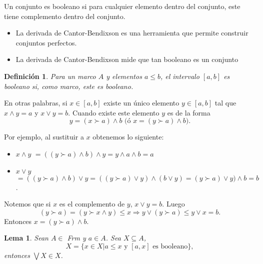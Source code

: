 \documentclass[12pt,letterpaper,titlepage]{article}
\newtheorem*{defn}{Definición}
\newtheorem{lemma}{Lema}
\theoremstyle{definition}
\newcommand\<{\langle}
\renewcommand\>{\rangle}
\begin{document}
Un conjunto es booleano si para cualquier elemento dentro del conjunto, este tiene complemento dentro del conjunto.
\begin{itemize}
\item La derivada de Cantor-Bendixson es una herramienta que permite construir conjuntos perfectos.
\item La derivada de Cantor-Bendixson mide que tan booleano es un conjunto
\end{itemize}

\begin{defn}
Para un marco $A$ y elementos $a\leq b$, el intervalo $[a,b]$ es booleano si, como marco, este es booleano.
\end{defn}

\noindent
En otras palabras, si $x\in[a,b]$ existe un único elemento $y\in[a,b]$ tal que $x\wedge y=a$ y $x\vee y=b$. Cuando existe este elemento $y$ es de la forma $$y=(x\succ a)\wedge b\mbox{  (ó }x=(y\succ a)\wedge b).$$

\noindent
Por ejemplo, al sustituir a $x$ obtenemos lo siguiente:

\begin{itemize}
    \item $x\wedge y$ $=((y\succ a)\wedge b)\wedge y=y\wedge a\wedge b=a$
\item $x\vee y$ $=((y\succ a)\wedge b)\vee y=((y\succ a)\vee y)\wedge (b\vee y)=(y\succ a)\vee y)\wedge b=b$.
\end{itemize}

\noindent
Notemos que si $x$ es el complemento de $y$, $x\vee y=b$. Luego $$(y\succ a)=(y\succ x\wedge y)\leq x\Rightarrow y\vee (y\succ a)\leq y\vee x=b.$$
Entonces $x=(y\succ a)\wedge b.$

\begin{lemma}
Sean $A\in$ \textit{Frm} y $a\in A$. Sea $X\subseteq A$, $$X=\{x\in X|a\leq x\mbox{ y } [a, x]\mbox{ es booleano}\},$$ entonces $\bigvee X\in X$. 
\end{lemma}
\end{document}
